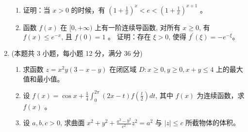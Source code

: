 \begin{enumerate}
\begin{enumerate}
	
	\item
	证明：当 $x>0$ 的时候，有 $\left(1+\frac{1}{x}\right)^{x}<e<\left(1+\frac{1}{x}\right)^{x+1}$ 。
	
	
	\item
	函数 $f(x)$ 在 $[0,+\infty)$ 上有一阶连续导函数, 对所有 $x \geqslant 0$, 有 $f(x) \leqslant e^{-x}$, 且 $f(0)=1$ 。 证明：存在 $\xi>0$, 使得 $f^{\prime}(\xi)=-e^{-\xi}$。
	
	
	
	
\end{enumerate}

	
	
	
\item 
(本题共 3 小题，每小题 12 分，满分 36 分)
\begin{enumerate}
	\item
 求函数 $z=x^{2} y(3-x-y)$ 在闭区域 $D: x \geqslant 0, y \geqslant 0, x+y \leqslant 4$ 上的最大值和最小值。
	
	
	\item
	设 $f(x)=\cos x+\frac{1}{4} \int_{0}^{2 \pi}(2 x-t) f\left(\frac{t}{2}\right) d t$, 其中 $f(x)$ 为连续函数，求 $f(x)$ 。
	
	
	\item
	设 $a, b, c>0$, 求曲面 $x^{2}+y^{2}+\frac{a^{2}-b^{2}}{c^{2}} z^{2}=a^{2}$ 与 $|z| \leqslant c$ 所截物体的体积。
	

\end{enumerate}
\end{enumerate}
